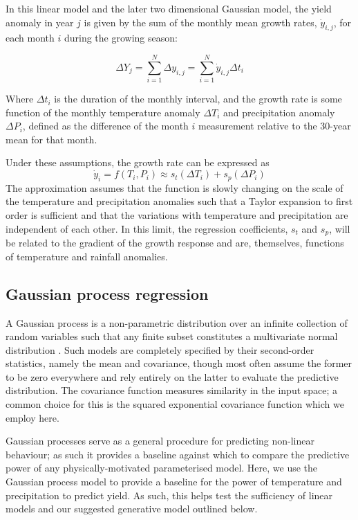 \documentclass[12pt]{article}
\begin{document}
In this linear model and the later two dimensional Gaussian model, the yield anomaly in year $j$ is given by the sum of the monthly mean growth rates, $\dot{y}_{i,j}$, for each month $i$ during the growing season:

\begin{equation}
\Delta Y_j = \sum_{i=1}^{N} \Delta y_{i,j} = \sum_{i=1}^{N} \dot{y}_{i,j}\Delta t_i
\end{equation}

Where $\Delta t_i$ is the duration of the monthly interval, and the growth rate is some function of the monthly temperature anomaly $\Delta T_i$ and precipitation anomaly $\Delta P_i$, defined as the difference of the month $i$ measurement relative to the 30-year mean for that month. 


Under these assumptions, the growth rate can be expressed as
\begin{equation}
\dot{y}_i = f(T_i, P_i) \approx s_t(\Delta T_i) + s_p(\Delta P_i)
\end{equation}
The approximation assumes that the function is slowly changing on the scale of the temperature and precipitation anomalies such that a Taylor expansion to first order is sufficient and that the variations with temperature and precipitation are independent of each other. In this limit, the regression coefficients, $s_t$ and $s_p$, will be related to the gradient of the growth response and are, themselves, functions of temperature and rainfall anomalies.

\subsection{Gaussian process regression}
\label{sec:GP_descrip_appendix}
A Gaussian process is a non-parametric distribution over an infinite collection of random variables such that any finite subset constitutes a multivariate normal distribution \citep{rasmussen:2005}. Such models are completely specified by their second-order statistics, namely the mean and covariance, though most often assume the former to be zero everywhere and rely entirely on the latter to evaluate the predictive distribution. The covariance function measures similarity in the input space; a common choice for this is the squared exponential covariance function which we employ here. 

Gaussian processes serve as a general procedure for predicting non-linear behaviour; as such it provides a baseline against which to compare the predictive power of any physically-motivated parameterised model. Here, we use the Gaussian process model to provide a baseline for the power of temperature and precipitation to predict yield. As such, this helps test the sufficiency of linear models and our suggested generative model outlined below.
\end{document}

